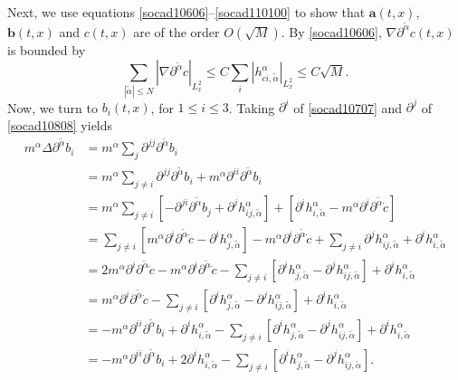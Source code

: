 \documentclass[reqno]{amsart}
\numberwithin{equation}{section}
\numberwithin{equation}{section}
\begin{document}
		Next, we use equations \eqref{socad10606}--\eqref{socad110100} to show that $\mathbf{a}(t,x)$, $\mathbf{b}(t,x)$ and $c(t,x)$ are of the order $O(\sqrt{M})$. By \eqref{socad10606}, $\nabla\partial^{\tilde{\alpha}} c(t, x)$ is bounded by
		\begin{equation}
		\sum_{|\tilde{\alpha}| \le N} |\nabla\partial^{\tilde{\alpha}} c|_{L_x^2} \leq C \sum_i |h_{ci,\tilde{\alpha}}^\alpha|_{L_x^2} \le C \sqrt{M}.\label{socaed112112} 
		\end{equation}
		Now, we turn to $b_i(t, x)$, for $1 \le i \le 3$. Taking $\partial^i$ of \eqref{socad10707} and $\partial^j$ of \eqref{socad10808} yields
		\begin{align*}
			m^{\alpha}\Delta \partial^{\tilde{\alpha}} b_i &= m^{\alpha}\sum_j \partial^{jj} \partial^{\tilde{\alpha}} b_i \\
			&= m^{\alpha}\sum_{j \neq i} \partial^{jj} \partial^{\tilde{\alpha}} b_i + m^{\alpha}\partial^{ii} \partial^{\tilde{\alpha}} b_i \\
			&= m^{\alpha}\sum_{j \neq i} \left[ -\partial^{ji} \partial^{\tilde{\alpha}} b_j + \partial^j h_{ij,\tilde{\alpha}}^\alpha \right] + \left[ \partial^i h_{i,\tilde{\alpha}}^\alpha - m^{\alpha}\partial^i \partial^{\tilde{\alpha}} \dot{c} \right] \\
			&= \sum_{j \neq i} \left[ m^{\alpha}\partial^i \partial^{\tilde{\alpha}} \dot{c} - \partial^i h_{j,\tilde{\alpha}}^\alpha \right] - m^{\alpha}\partial^i \partial^{\tilde{\alpha}} \dot{c} + \sum_{j \neq i} \partial^j h_{ij,\tilde{\alpha}}^\alpha + \partial^i h_{i,\tilde{\alpha}}^\alpha \\
			&= 2m^{\alpha}\partial^i \partial^{\tilde{\alpha}} \dot{c} - m^{\alpha}\partial^i \partial^{\tilde{\alpha}} \dot{c} - \sum_{j \neq i} \left[ \partial^i h_{j,\tilde{\alpha}}^\alpha - \partial^j h_{ij,\tilde{\alpha}}^\alpha \right] + \partial^i h_{i,\tilde{\alpha}}^\alpha \\
			&= m^{\alpha}\partial^i \partial^{\tilde{\alpha}} \dot{c} - \sum_{j \neq i} \left[ \partial^i h_{j,\tilde{\alpha}}^\alpha - \partial^j h_{ij,\tilde{\alpha}}^\alpha \right] + \partial^i h_{i,\tilde{\alpha}}^\alpha\\
			&= -m^{\alpha}\partial^{i i} \partial^{\tilde{\alpha}} b_i + \partial^i h_{i,\tilde{\alpha}}^\alpha - \sum_{j \neq i} \left[ \partial^i h_{j,\tilde{\alpha}}^\alpha - \partial^j h_{ij,\tilde{\alpha}}^\alpha \right] + \partial^i h_{i,\tilde{\alpha}}^\alpha \\
			&= -m^{\alpha}\partial^{i i} \partial^{\tilde{\alpha}} b_i + 2\partial^i h_{i,\tilde{\alpha}}^\alpha - \sum_{j \neq i} \left[ \partial^i h_{j,\tilde{\alpha}}^\alpha - \partial^j h_{ij,\tilde{\alpha}}^\alpha \right].
		\end{align*}
\end{document}
